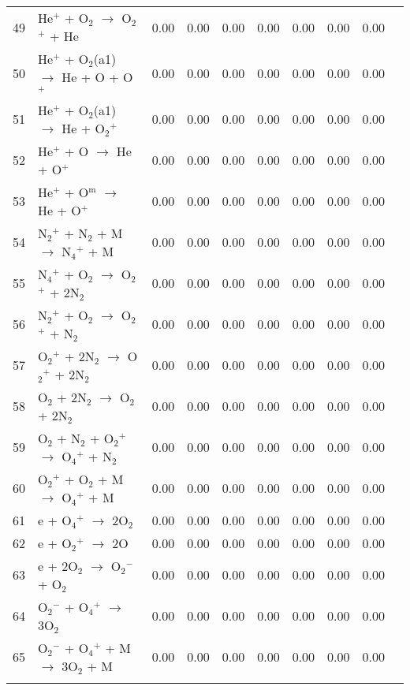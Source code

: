 \documentclass{article}
\begin{document}
\begin{table}[H]
{\begin{tabu}{clcccccccc}
      49 & He$^{+}$ + O$_{2}$ $\rightarrow$ O$_{2}$$^{+}$ + He & 0.00 & 0.00 & 0.00 & 0.00 & 0.00 & 0.00 & 0.00 &  \\
      50 & He$^{+}$ + O$_{2}$(a1) $\rightarrow$ He + O + O$^{+}$ & 0.00 & 0.00 & 0.00 & 0.00 & 0.00 & 0.00 & 0.00 &  \\
      51 & He$^{+}$ + O$_{2}$(a1) $\rightarrow$ He + O$_{2}$$^{+}$ & 0.00 & 0.00 & 0.00 & 0.00 & 0.00 & 0.00 & 0.00 &  \\
      52 & He$^{+}$ + O $\rightarrow$ He + O$^{+}$ & 0.00 & 0.00 & 0.00 & 0.00 & 0.00 & 0.00 & 0.00 &  \\
      53 & He$^{+}$ + O$^\text{m}$ $\rightarrow$ He + O$^{+}$ & 0.00 & 0.00 & 0.00 & 0.00 & 0.00 & 0.00 & 0.00 &  \\
      54 & N$_{2}$$^{+}$ + N$_{2}$ + M $\rightarrow$ N$_{4}$$^{+}$ + M & 0.00 & 0.00 & 0.00 & 0.00 & 0.00 & 0.00 & 0.00 &  \\
      55 & N$_{4}$$^{+}$ + O$_{2}$ $\rightarrow$ O$_{2}$$^{+}$ + 2N$_{2}$ & 0.00 & 0.00 & 0.00 & 0.00 & 0.00 & 0.00 & 0.00 &  \\
      56 & N$_{2}$$^{+}$ + O$_{2}$ $\rightarrow$ O$_{2}$$^{+}$ + N$_{2}$ & 0.00 & 0.00 & 0.00 & 0.00 & 0.00 & 0.00 & 0.00 &  \\
      57 & O$_{2}$$^{+}$ + 2N$_{2}$ $\rightarrow$ O$_{2}$$^{+}$ + 2N$_{2}$ & 0.00 & 0.00 & 0.00 & 0.00 & 0.00 & 0.00 & 0.00 &  \\
      58 & O$_{2}$ + 2N$_{2}$ $\rightarrow$ O$_{2}$ + 2N$_{2}$ & 0.00 & 0.00 & 0.00 & 0.00 & 0.00 & 0.00 & 0.00 &  \\
      59 & O$_{2}$ + N$_{2}$ + O$_{2}$$^{+}$ $\rightarrow$ O$_{4}$$^{+}$ + N$_{2}$ & 0.00 & 0.00 & 0.00 & 0.00 & 0.00 & 0.00 & 0.00 &  \\
      60 & O$_{2}$$^{+}$ + O$_{2}$ + M $\rightarrow$ O$_{4}$$^{+}$ + M & 0.00 & 0.00 & 0.00 & 0.00 & 0.00 & 0.00 & 0.00 &  \\
      61 & e + O$_{4}$$^{+}$ $\rightarrow$ 2O$_{2}$ & 0.00 & 0.00 & 0.00 & 0.00 & 0.00 & 0.00 & 0.00 &  \\
      62 & e + O$_{2}$$^{+}$ $\rightarrow$ 2O & 0.00 & 0.00 & 0.00 & 0.00 & 0.00 & 0.00 & 0.00 &  \\
      63 & e + 2O$_{2}$ $\rightarrow$ O$_{2}$$^{-}$ + O$_{2}$ & 0.00 & 0.00 & 0.00 & 0.00 & 0.00 & 0.00 & 0.00 &  \\
      64 & O$_{2}$$^{-}$ + O$_{4}$$^{+}$ $\rightarrow$ 3O$_{2}$ & 0.00 & 0.00 & 0.00 & 0.00 & 0.00 & 0.00 & 0.00 &  \\
      65 & O$_{2}$$^{-}$ + O$_{4}$$^{+}$ + M $\rightarrow$ 3O$_{2}$ + M & 0.00 & 0.00 & 0.00 & 0.00 & 0.00 & 0.00 & 0.00 &  \\
$$
\end{tabu}}
\end{table}
\end{document}
